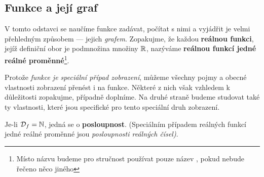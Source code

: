 {    \subsection{Funkce a její graf}\label{MAI:section_002}
      V tomto odstavci se naučíme funkce zadávat, počítat s nimi a vyjádřit je velmi přehledným 
      způsobem — jejich \emph{grafem}. Zopakujme, že každou \textbf{reálnou funkci}, jejíž 
      definiční obor je podmnožina množiny \(\mathbb{R}\), nazýváme \textbf{reálnou funkcí jedné 
      reálné proměnné}\footnote{Místo názvu  budeme pro 
      stručnost používat pouze název , pokud nebude řečeno něco jiného}.
      
      Protože \emph{funkce je speciální případ zobrazení}, můžeme všech\-ny pojmy a obecné 
      vlastnosti zobrazení přenést i na funkce. Některé z nich však vzhledem k důležitosti 
      zopakujme, případně doplníme. Na druhé straně budeme studovat také ty vlastnosti, které jsou 
      specifické pro tento speciální druh zobrazení.
      
      \begin{note}
        Je-li \(\mathcal{D}_f = \mathbb{N}\), jedná se o \textbf{posloupnost}. (Speciálním 
        případem reálných funkcí jedné reálné proměnné jsou \emph{posloupnosti reálných čísel)}.
      \end{note}
      
}
